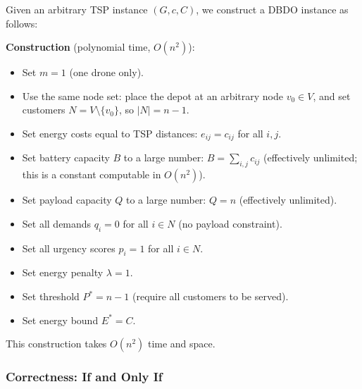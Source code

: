 \documentclass[12pt,a4paper]{article}
\begin{document}
Given an arbitrary TSP instance $(G, c, C)$, we construct a DBDO instance as follows:

\medskip
\noindent\textbf{Construction} (polynomial time, $O(n^2)$):

\begin{itemize}
  \item Set $m = 1$ (one drone only).
  \item Use the same node set: place the depot at an arbitrary node $v_0 \in V$, and set
  customers $N = V \setminus \{v_0\}$, so $|N| = n-1$.
  \item Set energy costs equal to TSP distances: $e_{ij} = c_{ij}$ for all $i,j$.
  \item Set battery capacity $B$ to a large number: $B = \sum_{i,j} c_{ij}$ (effectively
  unlimited; this is a constant computable in $O(n^2)$).
  \item Set payload capacity $Q$ to a large number: $Q = n$ (effectively unlimited).
  \item Set all demands $q_i = 0$ for all $i \in N$ (no payload constraint).
  \item Set all urgency scores $p_i = 1$ for all $i \in N$.
  \item Set energy penalty $\lambda = 1$.
  \item Set threshold $P^* = n-1$ (require all customers to be served).
  \item Set energy bound $E^* = C$.
\end{itemize}

This construction takes $O(n^2)$ time and space.

\subsubsection{Correctness: If and Only If}
\end{document}
